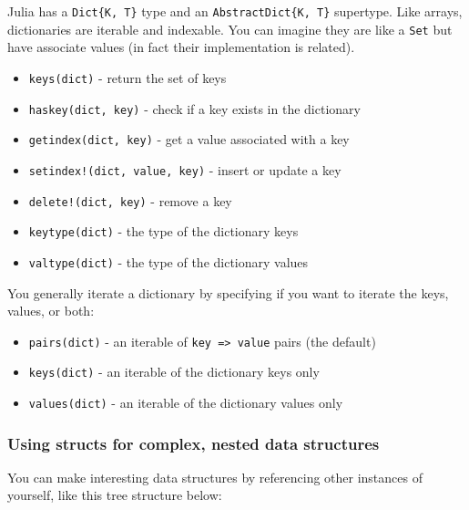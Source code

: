 \documentclass[
]{article}
\providecommand{\tightlist}{%
  \setlength{\itemsep}{0pt}\setlength{\parskip}{0pt}}
\begin{document}
Julia has a \texttt{Dict\{K,\ T\}} type and an
\texttt{AbstractDict\{K,\ T\}} supertype. Like arrays, dictionaries are
iterable and indexable. You can imagine they are like a \texttt{Set} but
have associate values (in fact their implementation is related).

\begin{itemize}
\tightlist
\item
  \texttt{keys(dict)} - return the set of keys
\item
  \texttt{haskey(dict,\ key)} - check if a key exists in the dictionary
\item
  \texttt{getindex(dict,\ key)} - get a value associated with a key
\item
  \texttt{setindex!(dict,\ value,\ key)} - insert or update a key
\item
  \texttt{delete!(dict,\ key)} - remove a key
\item
  \texttt{keytype(dict)} - the type of the dictionary keys
\item
  \texttt{valtype(dict)} - the type of the dictionary values
\end{itemize}

You generally iterate a dictionary by specifying if you want to iterate
the keys, values, or both:

\begin{itemize}
\tightlist
\item
  \texttt{pairs(dict)} - an iterable of
  \texttt{key\ =\textgreater{}\ value} pairs (the default)
\item
  \texttt{keys(dict)} - an iterable of the dictionary keys only
\item
  \texttt{values(dict)} - an iterable of the dictionary values only
\end{itemize}

\subsubsection{Using structs for complex, nested data
structures}\label{using-structs-for-complex-nested-data-structures}

You can make interesting data structures by referencing other instances
of yourself, like this tree structure below:
\end{document}
